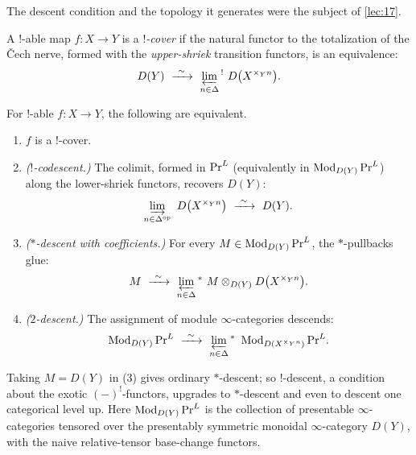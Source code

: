 The descent condition and the topology it generates were the subject of
\cref{lec:17}.

\begin{definition}[$!$-cover]
\label{def:18:shriek-cover}
A $!$-able map $f\colon X\to Y$ is a \emph{$!$-cover} if the natural functor to the
totalization of the \v Cech nerve, formed with the \emph{upper-shriek} transition
functors, is an equivalence:
\begin{equation*}
D(Y)\ \xrightarrow{\ \sim\ }\ \varprojlim_{n\in\Delta}{}^{!}\ D\bigl(X^{\times_Y n}\bigr).
\end{equation*}
\end{definition}

\begin{theorem}
\label{thm:18:tfae}
For $!$-able $f\colon X\to Y$, the following are equivalent.
\begin{enumerate}
\item $f$ is a $!$-cover.
\item \emph{($!$-codescent.)} The colimit, formed in $\mathrm{Pr}^{L}$ (equivalently in
$\operatorname{Mod}_{D(Y)}\mathrm{Pr}^{L}$) along the lower-shriek functors, recovers $D(Y)$:
\begin{equation}
\label{eq:18:codescent}
\varinjlim_{n\in\Delta^{\mathrm{op}}}\ D\bigl(X^{\times_Y n}\bigr)\ \xrightarrow{\ \sim\ }\ D(Y).
\end{equation}
\item \emph{($*$-descent with coefficients.)} For every $M\in\operatorname{Mod}_{D(Y)}\mathrm{Pr}^{L}$, the
$*$-pullbacks glue:
\begin{equation*}
M\ \xrightarrow{\ \sim\ }\ \varprojlim_{n\in\Delta}{}^{*}\ M\otimes_{D(Y)}D\bigl(X^{\times_Y n}\bigr).
\end{equation*}
\item \emph{($2$-descent.)} The assignment of module $\infty$-categories descends:
\begin{equation*}
\Mod_{D(Y)}\PrL\ \xrightarrow{\ \sim\ }\ \varprojlim_{n\in\Delta}{}^{*}\ \Mod_{D(X^{\times_Y n})}\PrL.
\end{equation*}
\end{enumerate}
Taking $M=D(Y)$ in (3) gives ordinary $*$-descent; so $!$-descent, a condition
about the exotic $(-)^!$-functors, upgrades to $*$-descent and even to descent one
categorical level up. Here $\operatorname{Mod}_{D(Y)}\mathrm{Pr}^{L}$ is the collection of presentable
$\infty$-categories tensored over the presentably symmetric monoidal
$\infty$-category $D(Y)$, with the naive relative-tensor base-change functors.
\end{theorem}

